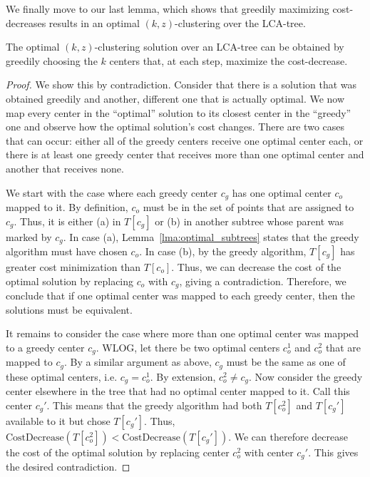 We finally move to our last lemma, which shows that greedily maximizing cost-decreases results in an optimal $(k, z)$-clustering over the LCA-tree.

\begin{lemma}
    \label{lma:greedy_is_optimal}
    The optimal $(k, z)$-clustering solution over an LCA-tree can be obtained by greedily choosing the $k$ centers that, at each step, maximize the
    cost-decrease.
\end{lemma}
\begin{proof}

    We show this by contradiction. Consider that there is a solution that was obtained greedily and another, different one that is actually optimal. We now map
    every center in the ``optimal'' solution to its closest center in the ``greedy'' one and observe how the optimal solution's cost changes. There are two
    cases that can occur: either all of the greedy centers receive one optimal center each, or there is at least one greedy center that receives more than one
    optimal center and another that receives none.
    
    We start with the case where each greedy center $c_g$ has one optimal center $c_o$ mapped to it. By definition, $c_o$ must be in the set of points that are
    assigned to $c_g$. Thus, it is either (a) in $T[c_g]$ or (b) in another subtree whose parent was marked by $c_g$. In case (a),
    Lemma~\ref{lma:optimal_subtrees} states that the greedy algorithm must have chosen $c_o$. In case (b), by the greedy algorithm, $T[c_g]$ has greater cost
    minimization than $T[c_o]$. Thus, we can decrease the cost of the optimal solution by replacing $c_o$ with $c_g$, giving a contradiction.  Therefore, we
    conclude that if one optimal center was mapped to each greedy center, then the solutions must be equivalent.
    
    It remains to consider the case where more than one optimal center was mapped to a greedy center $c_g$. WLOG, let there be two optimal centers $c_o^1$ and
    $c_o^2$ that are mapped to $c_g$. By a similar argument as above, $c_g$ must be the same as one of these optimal centers, i.e. $c_g = c_o^1$. By extension,
    $c_o^2 \neq c_g$.  Now consider the greedy center elsewhere in the tree that had no optimal center mapped to it. Call this center $c_g'$. This means that
    the greedy algorithm had both $T[c_o^2]$ and $T[c_g']$ available to it but chose $T[c_g']$. Thus, $\text{CostDecrease}(T[c_o^2]) < \text{CostDecrease}(T[c_g'])$. We can therefore decrease
    the cost of the optimal solution by replacing center $c_o^2$ with center $c_g'$.  This gives the desired contradiction.

\end{proof}

